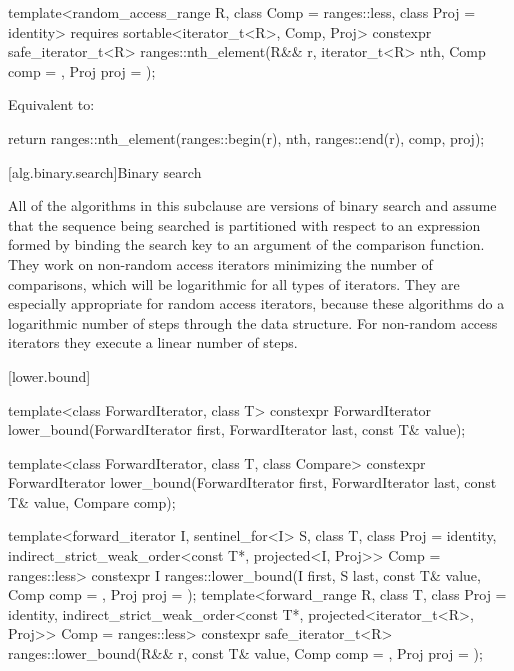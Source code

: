 \begin{itemdecl}
template<random_access_range R, class Comp = ranges::less, class Proj = identity>
  requires sortable<iterator_t<R>, Comp, Proj>
  constexpr safe_iterator_t<R>
    ranges::nth_element(R&& r, iterator_t<R> nth, Comp comp = {}, Proj proj = {});
\end{itemdecl}

\begin{itemdescr}
\pnum
\effects
Equivalent to:
\begin{codeblock}
return ranges::nth_element(ranges::begin(r), nth, ranges::end(r), comp, proj);
\end{codeblock}
\end{itemdescr}

[alg.binary.search]{Binary search}

\pnum
All of the algorithms in this subclause are versions of binary search and
assume that the sequence being searched
is partitioned with respect to an expression
formed by binding the search key to an argument of the comparison function.
They work on non-random access iterators minimizing the number of comparisons,
which will be logarithmic for all types of iterators.
They are especially appropriate for random access iterators,
because these algorithms do a logarithmic number of steps
through the data structure.
For non-random access iterators they execute a linear number of steps.

[lower.bound]{}

%
\begin{itemdecl}
template<class ForwardIterator, class T>
  constexpr ForwardIterator
    lower_bound(ForwardIterator first, ForwardIterator last,
                const T& value);

template<class ForwardIterator, class T, class Compare>
  constexpr ForwardIterator
    lower_bound(ForwardIterator first, ForwardIterator last,
                const T& value, Compare comp);

template<forward_iterator I, sentinel_for<I> S, class T, class Proj = identity,
         indirect_strict_weak_order<const T*, projected<I, Proj>> Comp = ranges::less>
  constexpr I ranges::lower_bound(I first, S last, const T& value, Comp comp = {},
                                  Proj proj = {});
template<forward_range R, class T, class Proj = identity,
         indirect_strict_weak_order<const T*, projected<iterator_t<R>, Proj>> Comp =
           ranges::less>
  constexpr safe_iterator_t<R>
    ranges::lower_bound(R&& r, const T& value, Comp comp = {}, Proj proj = {});
\end{itemdecl}

